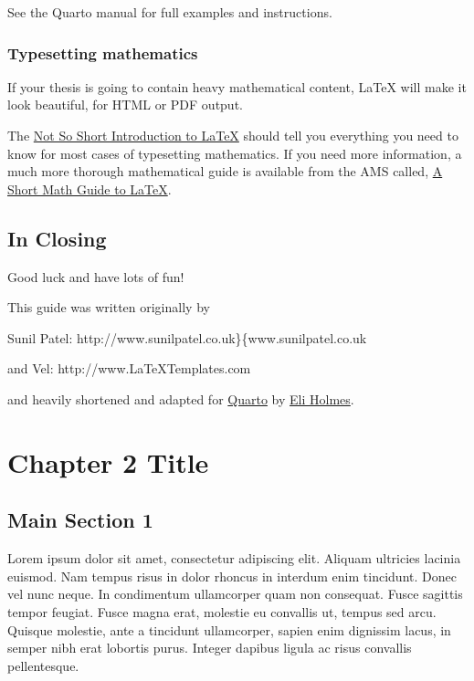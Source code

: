 \documentclass[
  letterpaper,
  11pt,
  english,
  singlespacing,
  headsepline]{MastersDoctoralThesis}
\begin{document}
See the Quarto manual for full examples and instructions.

\subsection{Typesetting mathematics}\label{typesetting-mathematics}

If your thesis is going to contain heavy mathematical content, \LaTeX{}
will make it look beautiful, for HTML or PDF output.

The
\href{http://www.ctan.org/tex-archive/info/lshort/english/lshort.pdf}{Not
So Short Introduction to LaTeX} should tell you everything you need to
know for most cases of typesetting mathematics. If you need more
information, a much more thorough mathematical guide is available from
the AMS called,
\href{http://tug.ctan.org/info/short-math-guide/short-math-guide.pdf}{A
Short Math Guide to LaTeX}.

\section{In Closing}\label{in-closing}

Good luck and have lots of fun!

This guide was written originally by

Sunil Patel: http://www.sunilpatel.co.uk\}\{www.sunilpatel.co.uk

and Vel: http://www.LaTeXTemplates.com

and heavily shortened and adapted for \href{https://quarto.org/}{Quarto}
by \href{https://eeholmes.github.io}{Eli Holmes}.


\chapter{Chapter 2 Title}\label{sec-Chapter2}

\section{Main Section 1}\label{main-section-1}

Lorem ipsum dolor sit amet, consectetur adipiscing elit. Aliquam
ultricies lacinia euismod. Nam tempus risus in dolor rhoncus in interdum
enim tincidunt. Donec vel nunc neque. In condimentum ullamcorper quam
non consequat. Fusce sagittis tempor feugiat. Fusce magna erat, molestie
eu convallis ut, tempus sed arcu. Quisque molestie, ante a tincidunt
ullamcorper, sapien enim dignissim lacus, in semper nibh erat lobortis
purus. Integer dapibus ligula ac risus convallis pellentesque.
\end{document}
